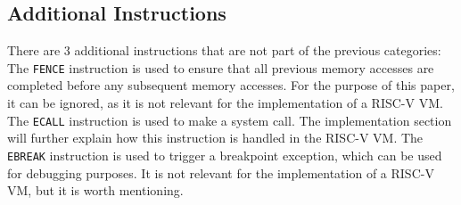 \documentclass[sigconf]{acmart}
\begin{document}
\subsection{Additional Instructions}
There are 3 additional instructions that are not part of the previous categories:
The \texttt{FENCE} instruction is used to ensure that all previous memory accesses are completed before any subsequent memory accesses. For the purpose of this paper, it can be ignored, as it is not relevant for the implementation of a RISC-V VM.
The \texttt{ECALL} instruction is used to make a system call. The implementation section will  further explain how this instruction is handled in the RISC-V VM.
The \texttt{EBREAK} instruction is used to trigger a breakpoint exception, which can be used for debugging purposes. It is not relevant for the implementation of a RISC-V VM, but it is worth mentioning.
\end{document}
